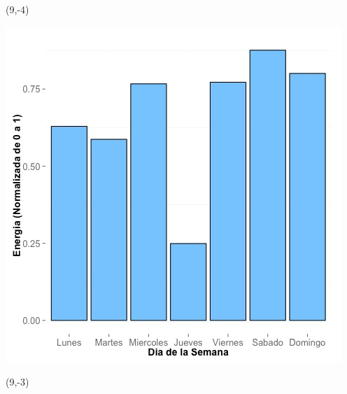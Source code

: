 \documentclass{article}\usepackage[]{graphicx}\usepackage[]{color}
\newenvironment{knitrout}{}{} %
\begin{document}
 \begin{textblock}{1}(9,-4)
\begin{minipage}{20em}
\begingroup

\endgroup
\end{minipage}
\end{textblock}


\begin{knitrout}
\color{fgcolor}
\includegraphics[scale=0.65]{figure/A15_day_of_week_plot} 
\end{knitrout}


 \begin{textblock}{1}(9,-3)
\begin{minipage}{20em}
\begingroup

\endgroup
\end{minipage}
\end{textblock}
\end{document}
